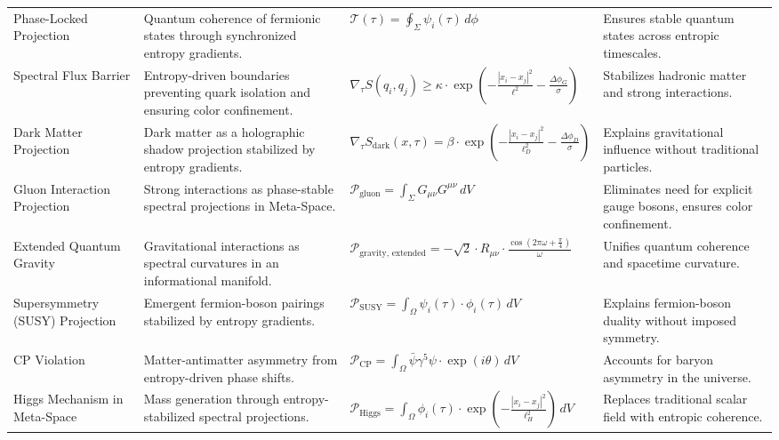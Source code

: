 \documentclass[10.5pt,a4paper]{article}
\begin{document}
{\begin{longtable}{p{3cm} p{6.5cm} p{4cm} p{4cm}}
Phase-Locked Projection & Quantum coherence of fermionic states through synchronized entropy gradients. & \( \mathcal{T}(\tau) = \oint_\Sigma \psi_i(\tau) \, d\phi \) & Ensures stable quantum states across entropic timescales. \\

Spectral Flux Barrier & Entropy-driven boundaries preventing quark isolation and ensuring color confinement. & \( \nabla_\tau S(q_i, q_j) \geq \kappa \cdot \exp\left(-\frac{|x_i - x_j|^2}{\ell^2} - \frac{\Delta \phi_G}{\sigma}\right) \) & Stabilizes hadronic matter and strong interactions. \\

Dark Matter Projection & Dark matter as a holographic shadow projection stabilized by entropy gradients. & \( \nabla_\tau S_{\text{dark}}(x, \tau) = \beta \cdot \exp\left(-\frac{|x_i - x_j|^2}{\ell_D^2} - \frac{\Delta \phi_D}{\sigma}\right) \) & Explains gravitational influence without traditional particles. \\

Gluon Interaction Projection & Strong interactions as phase-stable spectral projections in Meta-Space. & \( \mathcal{P}_{\text{gluon}} = \int_\Sigma G_{\mu\nu} G^{\mu\nu} \, dV \) & Eliminates need for explicit gauge bosons, ensures color confinement. \\

Extended Quantum Gravity & Gravitational interactions as spectral curvatures in an informational manifold. & \( \mathcal{P}_{\text{gravity, extended}} = -\sqrt{2} \cdot R_{\mu\nu} \cdot \frac{\cos(2\pi \omega + \frac{\pi}{4})}{\omega} \) & Unifies quantum coherence and spacetime curvature. \\

Supersymmetry (SUSY) Projection & Emergent fermion-boson pairings stabilized by entropy gradients. & \( \mathcal{P}_{\text{SUSY}} = \int_\Omega \psi_i(\tau) \cdot \phi_i(\tau) \, dV \) & Explains fermion-boson duality without imposed symmetry. \\

CP Violation & Matter-antimatter asymmetry from entropy-driven phase shifts. & \( \mathcal{P}_{\text{CP}} = \int_\Omega \bar{\psi} \gamma^5 \psi \cdot \exp(i\theta) \, dV \) & Accounts for baryon asymmetry in the universe. \\

Higgs Mechanism in Meta-Space & Mass generation through entropy-stabilized spectral projections. & \( \mathcal{P}_{\text{Higgs}} = \int_\Omega \phi_i(\tau) \cdot \exp\left(-\frac{|x_i - x_j|^2}{\ell_H^2}\right) \, dV \) & Replaces traditional scalar field with entropic coherence. \\


\end{longtable}}
\end{document}
